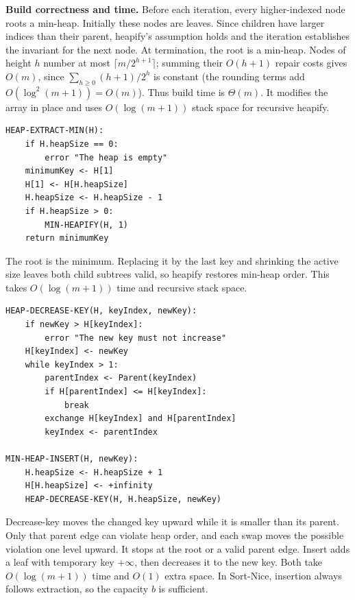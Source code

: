 \documentclass[11pt,a4paper]{article}
\begin{document}
\textbf{Build correctness and time.} Before each iteration, every higher-indexed node roots a min-heap. Initially these nodes are leaves. Since children have larger indices than their parent, heapify's assumption holds and the iteration establishes the invariant for the next node. At termination, the root is a min-heap. Nodes of height $h$ number at most $\lceil m/2^{h+1}\rceil$; summing their $O(h+1)$ repair costs gives $O(m)$, since $\sum_{h\ge0}(h+1)/2^h$ is constant (the rounding terms add $O(\log^2(m+1))=O(m)$). Thus build time is $\Theta(m)$. It modifies the array in place and uses $O(\log(m+1))$ stack space for recursive heapify.

\begin{lstlisting}
HEAP-EXTRACT-MIN(H):
    if H.heapSize == 0:
        error "The heap is empty"
    minimumKey <- H[1]
    H[1] <- H[H.heapSize]
    H.heapSize <- H.heapSize - 1
    if H.heapSize > 0:
        MIN-HEAPIFY(H, 1)
    return minimumKey
\end{lstlisting}
The root is the minimum. Replacing it by the last key and shrinking the active size leaves both child subtrees valid, so heapify restores min-heap order. This takes $O(\log(m+1))$ time and recursive stack space.

\begin{lstlisting}
HEAP-DECREASE-KEY(H, keyIndex, newKey):
    if newKey > H[keyIndex]:
        error "The new key must not increase"
    H[keyIndex] <- newKey
    while keyIndex > 1:
        parentIndex <- Parent(keyIndex)
        if H[parentIndex] <= H[keyIndex]:
            break
        exchange H[keyIndex] and H[parentIndex]
        keyIndex <- parentIndex

MIN-HEAP-INSERT(H, newKey):
    H.heapSize <- H.heapSize + 1
    H[H.heapSize] <- +infinity
    HEAP-DECREASE-KEY(H, H.heapSize, newKey)
\end{lstlisting}
Decrease-key moves the changed key upward while it is smaller than its parent. Only that parent edge can violate heap order, and each swap moves the possible violation one level upward. It stops at the root or a valid parent edge. Insert adds a leaf with temporary key $+\infty$, then decreases it to the new key. Both take $O(\log(m+1))$ time and $O(1)$ extra space. In Sort-Nice, insertion always follows extraction, so the capacity $b$ is sufficient.
\end{document}
